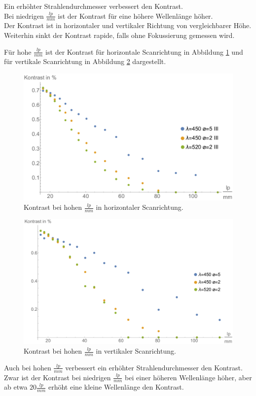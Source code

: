 Ein erhöhter Strahlendurchmesser verbessert den Kontrast.\\
Bei niedrigen $\frac{lp}{mm}$ ist der Kontrast für eine höhere Wellenlänge höher.\\
Der Kontrast ist in horizontaler und vertikaler Richtung von vergleichbarer Höhe.\\
Weiterhin sinkt der Kontrast rapide, falls ohne Fokussierung gemessen wird.

Für hohe $\frac{lp}{mm}$ ist der Kontrast für horizontale Scanrichtung in Abbildung \ref{fig:Versuch2_Plot2h2} und für vertikale Scanrichtung in Abbildung \ref{fig:Versuch2_Plot2v2} dargestellt.
\begin{figure}[H]
	\centering
\includegraphics[width=1.0\linewidth]{IMAGE/Versuch2Plot2horizontal2.pdf}
	\caption{Kontrast bei hohen $\frac{lp}{mm}$ in horizontaler Scanrichtung.}
	\label{fig:Versuch2_Plot2h2}
\end{figure} 

\begin{figure}[H]
	\centering
\includegraphics[width=1.0\linewidth]{IMAGE/Versuch2Plot2vertikal2.pdf}
	\caption{Kontrast bei hohen $\frac{lp}{mm}$ in vertikaler Scanrichtung.}
	\label{fig:Versuch2_Plot2v2}
\end{figure} 
Auch bei hohen $\frac{lp}{mm}$ verbessert ein erhöhter Strahlendurchmesser  den Kontrast. Zwar ist der Kontrast bei niedrigen $\frac{lp}{mm}$ bei einer höheren Wellenlänge höher, aber ab etwa $20 \frac{lp}{mm}$ erhöht eine kleine Wellenlänge den Kontrast.

